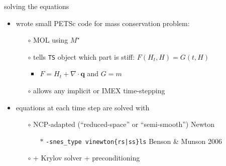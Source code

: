 \documentclass[hide notes,intlimits,usenames,dvipsnames]{beamer}
\newcommand{\Div}{\nabla\cdot}
\begin{document}
\begin{frame}{solving the equations}
\medskip
\begin{itemize}
\item wrote small PETSc code for mass conservation problem:
    \begin{itemize}
    \item[$\circ$] MOL using $M^\star$
    \item[$\circ$] tells \texttt{TS} object which part is stiff: $F(H_t,H) = G(t,H)$
        \begin{itemize}
        \item  $F=H_t + \Div \mathbf{q}$ and $G=m$
        \end{itemize}
    \item[$\circ$] allows any implicit or IMEX time-stepping
    \end{itemize}
\item equations at each time step are solved with
    \begin{itemize}
    \item[$\circ$] NCP-adapted (``reduced-space'' or ``semi-smooth'') Newton
        \begin{itemize}
        \item[$\ast$] \texttt{-snes\_type vinewton\{rs|ss\}ls} \hfill \tiny Benson \& Munson 2006 \normalsize
        \end{itemize}
    \item[$\circ$] + Krylov solver + preconditioning
    \end{itemize}
\end{itemize}
\end{frame}
\end{document}
